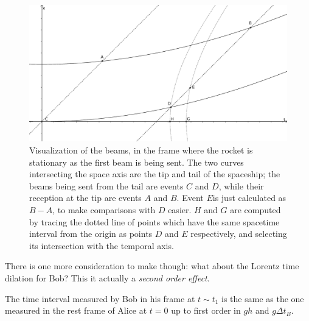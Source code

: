 \documentclass[main.tex]{subfiles}
\begin{document}
\begin{figure}[h]
  \centering
  \includegraphics[width=\textwidth]{figures/Visualization_of_accelerational_time_dilation.eps}
  \caption{Visualization of the beams, in the frame where the rocket is stationary as the first beam is being sent. The two curves intersecting the space axis are the tip and tail of the spaceship; the beams being sent from the tail are events \(C\) and \(D\), while their reception at the tip are events \(A\) and \(B\). Event \(E\)is just calculated as \(B-A\), to make comparisons with \(D\) easier. \(H\) and \(G\) are computed by tracing the dotted line of points which have the same spacetime interval from the origin as points \(D\) and \(E\) respectively, and selecting its intersection with the temporal axis.}
  \label{fig:beam-visualization}
\end{figure}

There is one more consideration to make though: what about the Lorentz time dilation for Bob? This it actually a \emph{second order effect}.

\begin{claim}
The time interval measured by Bob in his frame at \(t \sim t_1\) is the same as the one measured in the rest frame of Alice at \(t=0\) up to first order in \(gh\) and \(g \Delta t_B\).
\end{claim}
\end{document}

